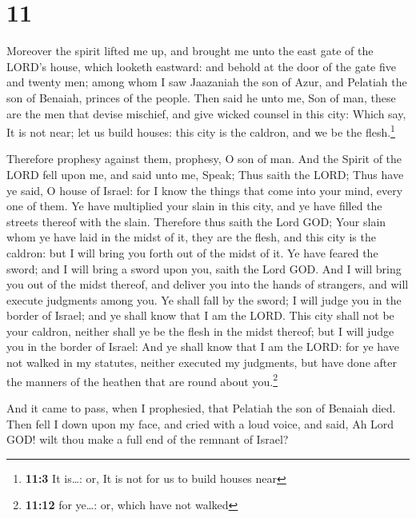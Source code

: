 \hypertarget{section-10}{%
\section{11}\label{section-10}}

 Moreover the spirit lifted me up, and brought me unto the
east gate of the LORD's house, which looketh eastward: and behold at the
door of the gate five and twenty men; among whom I saw Jaazaniah the son
of Azur, and Pelatiah the son of Benaiah, princes of the people.
 Then said he unto me, Son of man, these are the men that
devise mischief, and give wicked counsel in this city: 
Which say, It is not near; let us build houses: this city is the
caldron, and we be the flesh.\footnote{\textbf{11:3} It is\ldots: or, It
  is not for us to build houses near}

 Therefore prophesy against them, prophesy, O son of man.
 And the Spirit of the LORD fell upon me, and said unto
me, Speak; Thus saith the LORD; Thus have ye said, O house of Israel:
for I know the things that come into your mind, every one of them.
 Ye have multiplied your slain in this city, and ye have
filled the streets thereof with the slain.  Therefore thus
saith the Lord GOD; Your slain whom ye have laid in the midst of it,
they are the flesh, and this city is the caldron: but I will bring you
forth out of the midst of it.  Ye have feared the sword;
and I will bring a sword upon you, saith the Lord GOD. 
And I will bring you out of the midst thereof, and deliver you into the
hands of strangers, and will execute judgments among you.
 Ye shall fall by the sword; I will judge you in the
border of Israel; and ye shall know that I am the LORD. 
This city shall not be your caldron, neither shall ye be the flesh in
the midst thereof; but I will judge you in the border of Israel:
 And ye shall know that I am the LORD: for ye have not
walked in my statutes, neither executed my judgments, but have done
after the manners of the heathen that are round about you.\footnote{\textbf{11:12}
  for ye\ldots: or, which have not walked}

 And it came to pass, when I prophesied, that Pelatiah
the son of Benaiah died. Then fell I down upon my face, and cried with a
loud voice, and said, Ah Lord GOD! wilt thou make a full end of the
remnant of Israel?

